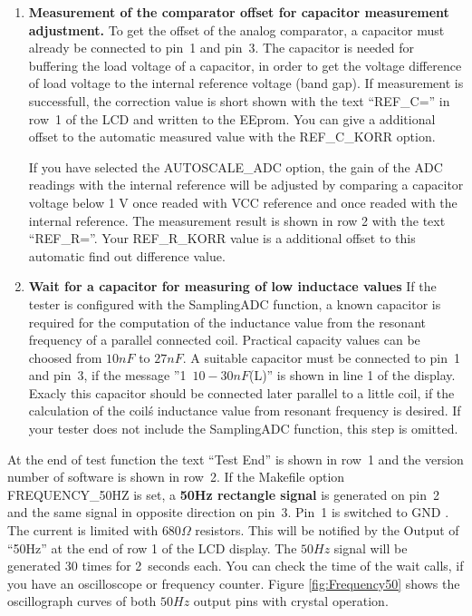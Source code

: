 \begin{enumerate}
\item {\bf Measurement of the comparator offset for capacitor measurement adjustment.}
To get the offset of the analog comparator, a capacitor must already be connected to pin~1 and pin~3.
The capacitor is needed for buffering the load voltage of a capacitor, in order to get the voltage
difference of load voltage to the internal reference voltage (band gap).
If measurement is successfull, the correction value is short shown with the text ``REF\_C='' in row~1 of 
the LCD and written to the EEprom. You can give a additional offset to the automatic measured value
with the REF\_C\_KORR option.

If you have selected the AUTOSCALE\_ADC option, the gain of the ADC readings with the internal reference
will be adjusted by comparing a capacitor voltage below 1 V once readed with VCC reference and once
readed with the internal reference. 
The measurement result is shown in row 2 with the text ``REF\_R=''. 
Your REF\_R\_KORR value is a additional offset to this automatic find out difference value.

\item {\bf Wait for a capacitor for measuring of low inductace values}
If the tester is configured with the SamplingADC function, a known capacitor is required for
the computation of the inductance value from the resonant frequency of a parallel connected coil.
Practical capacity values can be choosed from \(10nF\) to \(27nF\). 
A suitable capacitor must be connected to pin~1 and pin~3, if the message ''\mbox{1  \(10-30nF\)(L)}'' is shown in
line 1 of the display.
Exacly this capacitor should be connected later parallel to a little coil,
if the calculation of the coil\'s inductance value from resonant frequency is desired.
If your tester does not include the SamplingADC function, this step is omitted.

\end{enumerate}

At the end of test function the text ``Test End''  is shown in row~1 and the version number of software is shown in row~2.
If the Makefile option FREQUENCY\_50HZ is set, a {\bf 50Hz rectangle signal} is generated on pin~2 and 
the same signal in opposite direction on pin~3.
Pin~1 is switched to GND . The current is limited with \(680\Omega\) resistors.
This will be notified by the Output of ``50Hz'' at the end of row 1 of the LCD display.
The \(50Hz\) signal will be generated 30 times for 2~seconds each.
You can check the time of the wait calls, if you have an oscilloscope or frequency counter.
Figure \ref{fig:Frequency50} shows the oscillograph curves of both \(50Hz\) output pins with crystal operation.

